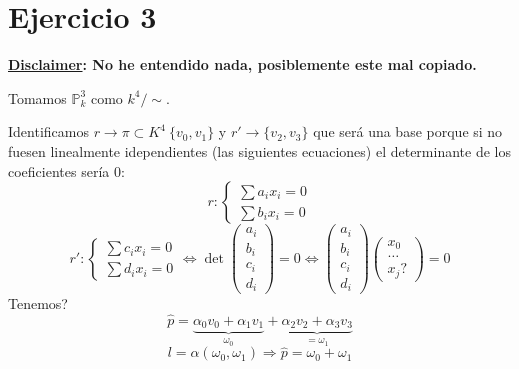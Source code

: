 \documentclass[10pt,a4paper,openright]{book}
\theoremstyle{break}
\begin{document}
\section{Ejercicio 3}%
\label{sec:ejercicio_3}
\textbf{\underline{Disclaimer}: No he entendido nada, posiblemente este mal copiado.} 

Tomamos $\mathbb{P}^{3}_{k}$ como $k^4 / \sim$. 

Identificamos $r \rightarrow \pi \subset K^4\ \{v_0, v_1\}$ y $r' \rightarrow \{v_2, v_3\}$ que será una base porque si no fuesen linealmente idependientes (las siguientes ecuaciones) el determinante de los coeficientes sería $0$: 
\[
r : \begin{cases}
    \sum a_ix_i = 0\\
    \sum b_i x_i = 0
\end{cases} 
\]\[
r' : \begin{cases}
    \sum c_i x_i = 0\\
    \sum d_i x_i = 0
\end{cases} \Leftrightarrow \det \begin{pmatrix} a_i\\ b_i\\ c_i\\ d_i \end{pmatrix} = 0 \Leftrightarrow \begin{pmatrix} a_i\\ b_i\\ c_i\\ d_i \end{pmatrix} \begin{pmatrix} x_0\\ \ldots\\ x_j? \end{pmatrix} = 0
\]
Tenemos?
\[
\hat{p} = \underbrace{\alpha_0 v_0 + \alpha_1 v_1}_{\omega_0} + \underbrace{\alpha_2 v_2 + \alpha_3 v_3}_{= \omega_1} 
\]\[
l = \alpha\left( \omega_0, \omega_1 \right) \Rightarrow \hat{p} = \omega_0 + \omega_1
\]
\end{document}

